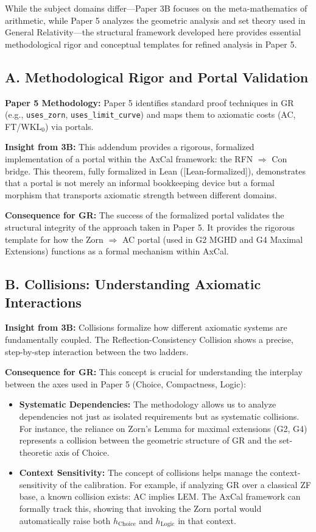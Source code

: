\documentclass[11pt]{article}
\newcommand{\leanok}{\textsf{\textcolor{green!70!black}{[Lean-formalized]}}}
\begin{document}
While the subject domains differ---Paper 3B focuses on the meta-mathematics of arithmetic, while Paper 5 analyzes the geometric analysis and set theory used in General Relativity---the structural framework developed here provides essential methodological rigor and conceptual templates for refined analysis in Paper 5.

\subsection{A. Methodological Rigor and Portal Validation}

\textbf{Paper 5 Methodology:} Paper 5 identifies standard proof techniques in GR (e.g., \texttt{uses\_zorn}, \texttt{uses\_limit\_curve}) and maps them to axiomatic costs (AC, FT/WKL$_0$) via portals.

\textbf{Insight from 3B:} This addendum provides a rigorous, formalized implementation of a portal within the AxCal framework: the RFN $\Rightarrow$ Con bridge. This theorem, fully formalized in Lean (\leanok), demonstrates that a portal is not merely an informal bookkeeping device but a formal morphism that transports axiomatic strength between different domains.

\textbf{Consequence for GR:} The success of the formalized portal validates the structural integrity of the approach taken in Paper 5. It provides the rigorous template for how the Zorn $\Rightarrow$ AC portal (used in G2 MGHD and G4 Maximal Extensions) functions as a formal mechanism within AxCal.

\subsection{B. Collisions: Understanding Axiomatic Interactions}

\textbf{Insight from 3B:} Collisions formalize how different axiomatic systems are fundamentally coupled. The Reflection-Consistency Collision shows a precise, step-by-step interaction between the two ladders.

\textbf{Consequence for GR:} This concept is crucial for understanding the interplay between the axes used in Paper 5 (Choice, Compactness, Logic):

\begin{itemize}
\item \textbf{Systematic Dependencies:} The methodology allows us to analyze dependencies not just as isolated requirements but as systematic collisions. For instance, the reliance on Zorn's Lemma for maximal extensions (G2, G4) represents a collision between the geometric structure of GR and the set-theoretic axis of Choice.

\item \textbf{Context Sensitivity:} The concept of collisions helps manage the context-sensitivity of the calibration. For example, if analyzing GR over a classical ZF base, a known collision exists: AC implies LEM. The AxCal framework can formally track this, showing that invoking the Zorn portal would automatically raise both $h_{\mathrm{Choice}}$ and $h_{\mathrm{Logic}}$ in that context.
\end{itemize}
\end{document}
